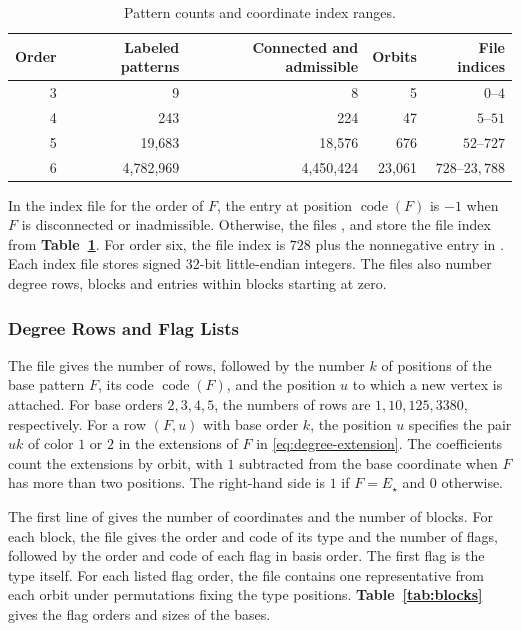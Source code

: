 \documentclass[preprint,11pt,numbers]{elsarticle-arxiv}
\numberwithin{equation}{section}
\theoremstyle{definition}
\begin{document}
\begin{table}[htbp]
\centering
\caption{Pattern counts and coordinate index ranges.}
\label{tab:coordinates}
\begin{tabular}{@{}rrrrr@{}}
\toprule
Order & Labeled patterns & Connected and admissible & Orbits & File indices\\
\midrule
3 & 9 & 8 & 5 & $0$--$4$\\
4 & 243 & 224 & 47 & $5$--$51$\\
5 & 19,683 & 18,576 & 676 & $52$--$727$\\
6 & 4,782,969 & 4,450,424 & 23,061 & $728$--$23,788$\\
\bottomrule
\end{tabular}
\end{table}

In the index file for the order of $F$, the entry at position
$\operatorname{code}(F)$ is $-1$ when $F$ is disconnected or
inadmissible. Otherwise, the files , 
and  store the file index from
\textbf{Table~\ref{tab:coordinates}}. For order six, the file index
is $728$ plus the nonnegative entry in
. Each index file stores signed
32-bit little-endian integers. The files also number degree rows,
blocks and entries within blocks starting at zero.

\subsubsection{Degree Rows and Flag Lists}\label{app:flag-lists}

The file  gives the number of rows, followed by
the number $k$ of positions of the base pattern $F$, its code
$\operatorname{code}(F)$, and the position $u$ to which a new vertex is
attached.
For base orders $2,3,4,5$, the numbers of rows are $1,10,125,3380$,
respectively. For a row $(F,u)$ with base order $k$, the position $u$
specifies the pair $uk$ of color $1$ or $2$ in the extensions of
$F$ in \eqref{eq:degree-extension}. The coefficients count the
extensions by orbit, with $1$ subtracted from the base coordinate
when $F$ has more than two positions. The right-hand side is $1$
if $F=E_\star$ and $0$ otherwise.

The first line of  gives the number of coordinates and
the number of blocks. For each block, the file gives the order and code
of its type and the number of flags, followed by the order and code of
each flag in basis order. The first flag is the type itself. For each
listed flag order, the file contains one representative from each orbit
under permutations fixing the type positions.
\textbf{Table~\ref{tab:blocks}} gives the flag orders and sizes of the
bases.
\end{document}
